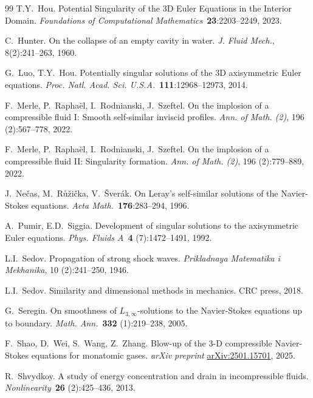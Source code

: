 \documentclass[11pt,reqno]{amsproc}
\numberwithin{equation}{section}
\theoremstyle{remark}
\begin{document}
\begin{thebibliography}{99}
T.Y.~Hou.
\newblock Potential Singularity of the 3D Euler Equations in the Interior Domain.
\newblock \textit{Foundations of Computational Mathematics}~\textbf{23}:2203--2249, 2023. 


C.~Hunter.
\newblock On the collapse of an empty cavity in water.
\newblock \textit{J. Fluid Mech.}, 8(2):241--263, 1960.

G.~Luo, T.Y.~Hou. 
\newblock Potentially singular solutions of the 3D axisymmetric Euler equations.
\newblock \textit{Proc. Natl. Acad. Sci. U.S.A.}~\textbf{111}:12968--12973, 2014.

F.~Merle, P.~Rapha{\"e}l, I.~Rodnianski,   J.~Szeftel.
\newblock On the implosion of a compressible fluid {I}: {S}mooth self-similar inviscid profiles.
\newblock \textit{Ann. of Math. (2)}, 196 (2):567--778, 2022.

F.~Merle, P.~Rapha{\"e}l, I.~Rodnianski,   J.~Szeftel.
\newblock On the implosion of a compressible fluid II: Singularity formation.
\newblock \textit{Ann. of Math. (2)}, 196 (2):779--889, 2022.

J.~Ne\v{c}as, M.~R\r{u}\v{z}i\v{c}ka, V.~\v{S}ver\'ak. 
\newblock On Leray's self-similar solutions of the Navier-Stokes equations.
\newblock \textit{Acta Math.}~{\bf 176}:283--294, 1996.


A.~Pumir, E.D.~Siggia. 
\newblock Development of singular solutions to the axisymmetric Euler equations. 
\newblock \textit{Phys. Fluids A}~\textbf{4} (7):1472--1491, 1992.


L.I.~Sedov.
\newblock Propagation of strong shock waves.
\newblock \textit{Prikladnaya Matematika i Mekhanika}, 10 (2):241--250, 1946.

L.I.~Sedov.
\newblock Similarity and dimensional methods in mechanics.
\newblock CRC press, 2018.

G.~Seregin.
\newblock On smoothness of $L_{3,\infty}$-solutions to the Navier-Stokes equations up to boundary.
\newblock \textit{Math. Ann.}~\textbf{332} (1):219--238, 2005. 

F.~Shao, D.~Wei, S.~Wang, Z.~Zhang. 
\newblock Blow-up of the 3-D compressible {N}avier-{S}tokes equations for monatomic gases.
\newblock \textit{arXiv preprint} \href{https://arxiv.org/abs/2501.15701}{arXiv:2501.15701}, 2025.

R.~Shvydkoy. 
\newblock A study of energy concentration and drain in incompressible fluids.
\newblock \textit{Nonlinearity}~\textbf{26} (2):425--436, 2013.


\end{thebibliography}
\end{document}
